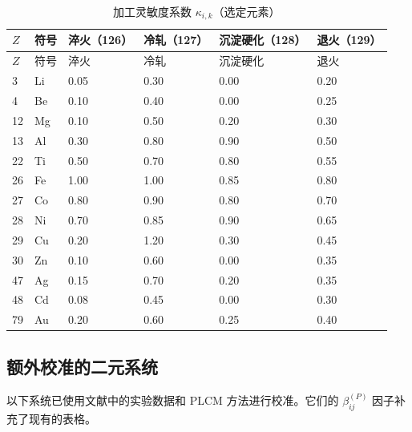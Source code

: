 \documentclass[12pt,a4paper]{article}
\begin{document}
	\begin{longtable}{p{1.8cm} p{1.2cm} p{1.2cm} p{1.2cm} p{1.2cm} p{1.2cm}}
		\caption{加工灵敏度系数 $\kappa_{i,k}$（选定元素）}\label{tab:kappa_ik}\\
		\toprule
		$Z$ & 符号 & 淬火（126） & 冷轧（127） & 沉淀硬化（128） & 退火（129） \\
		\midrule
		\endfirsthead
		\toprule
		$Z$ & 符号 & 淬火 & 冷轧 & 沉淀硬化 & 退火 \\
		\midrule
		\endhead
		3  & Li  & 0.05 & 0.30 & 0.00 & 0.20 \\
		4  & Be  & 0.10 & 0.40 & 0.00 & 0.25 \\
		12 & Mg  & 0.10 & 0.50 & 0.20 & 0.30 \\
		13 & Al  & 0.30 & 0.80 & 0.90 & 0.50 \\
		22 & Ti  & 0.50 & 0.70 & 0.80 & 0.55 \\
		26 & Fe  & 1.00 & 1.00 & 0.85 & 0.80 \\
		27 & Co  & 0.80 & 0.90 & 0.80 & 0.70 \\
		28 & Ni  & 0.70 & 0.85 & 0.90 & 0.65 \\
		29 & Cu  & 0.20 & 1.20 & 0.30 & 0.45 \\
		30 & Zn  & 0.10 & 0.60 & 0.00 & 0.35 \\
		47 & Ag  & 0.15 & 0.70 & 0.20 & 0.35 \\
		48 & Cd  & 0.08 & 0.45 & 0.00 & 0.30 \\
		79 & Au  & 0.20 & 0.60 & 0.25 & 0.40 \\
		\bottomrule
	\end{longtable}
	
	
	\subsection*{额外校准的二元系统}
	
	以下系统已使用文献中的实验数据和 PLCM 方法进行校准。它们的 $\beta_{ij}^{(P)}$ 因子补充了现有的表格。
	
\end{document}
